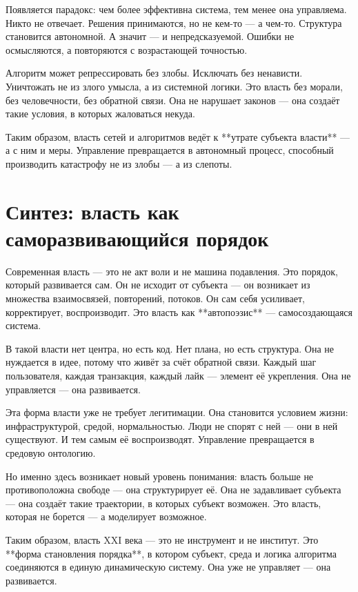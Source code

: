 Появляется парадокс: чем более эффективна система, тем менее она управляема. Никто не отвечает. Решения принимаются, но не кем-то — а чем-то. Структура становится автономной. А значит — и непредсказуемой. Ошибки не осмысляются, а повторяются с возрастающей точностью.

Алгоритм может репрессировать без злобы. Исключать без ненависти. Уничтожать не из злого умысла, а из системной логики. Это власть без морали, без человечности, без обратной связи. Она не нарушает законов — она создаёт такие условия, в которых жаловаться некуда.

Таким образом, власть сетей и алгоритмов ведёт к **утрате субъекта власти** — а с ним и меры. Управление превращается в автономный процесс, способный производить катастрофу не из злобы — а из слепоты.

\section{Синтез: власть как саморазвивающийся порядок}

Современная власть — это не акт воли и не машина подавления. Это порядок, который развивается сам. Он не исходит от субъекта — он возникает из множества взаимосвязей, повторений, потоков. Он сам себя усиливает, корректирует, воспроизводит. Это власть как **автопоэзис** — самосоздающаяся система.

В такой власти нет центра, но есть код. Нет плана, но есть структура. Она не нуждается в идее, потому что живёт за счёт обратной связи. Каждый шаг пользователя, каждая транзакция, каждый лайк — элемент её укрепления. Она не управляется — она развивается.

Эта форма власти уже не требует легитимации. Она становится условием жизни: инфраструктурой, средой, нормальностью. Люди не спорят с ней — они в ней существуют. И тем самым её воспроизводят. Управление превращается в средовую онтологию.

Но именно здесь возникает новый уровень понимания: власть больше не противоположна свободе — она структурирует её. Она не задавливает субъекта — она создаёт такие траектории, в которых субъект возможен. Это власть, которая не борется — а моделирует возможное.

Таким образом, власть XXI века — это не инструмент и не институт. Это **форма становления порядка**, в котором субъект, среда и логика алгоритма соединяются в единую динамическую систему. Она уже не управляет — она развивается.
